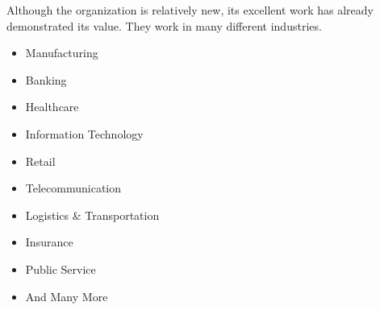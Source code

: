 \begin{flushleft}
Although the organization is relatively new, its excellent work has already demonstrated
its value. They work in many different industries.\\
\begin{itemize}
    \item Manufacturing
 \item Banking
 \item Healthcare
 \item Information Technology
 \item Retail
 \item Telecommunication
 \item Logistics \& Transportation
 \item Insurance
 \item Public Service
 \item And Many More
\end{itemize}

\end{flushleft}

